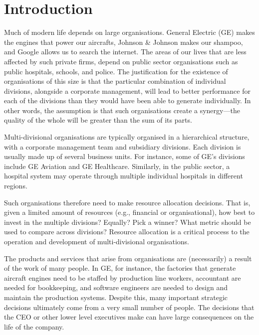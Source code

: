 \documentclass[a4paper, nobind, dvipsnames]{templates/ociamthesis}
\theoremstyle{definition}
\theoremstyle{definition}
\theoremstyle{definition}
\theoremstyle{definition}
\theoremstyle{remark}
\begin{document}
\hypertarget{introduction}{%
\chapter{Introduction}\label{introduction}}

\minitoc

Much of modern life depends on large organisations. General Electric (GE) makes
the engines that power our aircrafts, Johnson \& Johnson makes our shampoo, and
Google allows us to search the internet. The areas of our lives that are less
affected by such private firms, depend on public sector organisations such as
public hospitals, schools, and police. The justification for the existence of
organisations of this size is that the particular combination of individual
divisions, alongside a corporate management, will lead to better performance for
each of the divisions than they would have been able to generate individually.
In other words, the assumption is that such organisations create a synergy---the
quality of the whole will be greater than the sum of its parts.

Multi-divisional organisations are typically organised in a hierarchical
structure, with a corporate management team and subsidiary divisions. Each
division is usually made up of several business units. For instance, some of
GE's divisions include GE Aviation and GE Healthcare. Similarly, in the public
sector, a hospital system may operate through multiple individual hospitals in
different regions.

Such organisations therefore need to make resource allocation decisions. That
is, given a limited amount of resources (e.g., financial or organisational), how
best to invest in the multiple divisions? Equally? Pick a winner? What metric
should be used to compare across divisions? Resource allocation is a critical
process to the operation and development of multi-divisional organisations.

The products and services that arise from organisations are (necessarily) a
result of the work of many people. In GE, for instance, the factories that
generate aircraft engines need to be staffed by production line workers,
accountant are needed for bookkeeping, and software engineers are needed to
design and maintain the production systems. Despite this, many important
strategic decisions ultimately come from a very small number of people. The
decisions that the CEO or other lower level executives make can have large
consequences on the life of the company.
\end{document}
